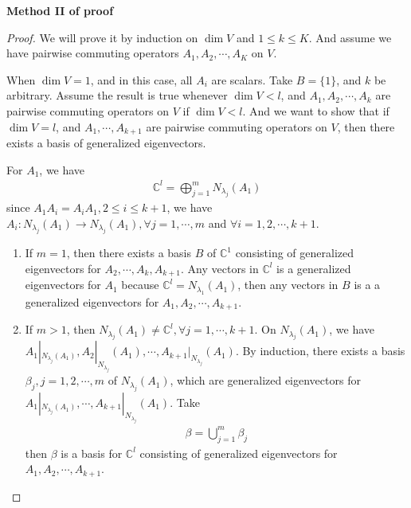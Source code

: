 \documentclass[11pt]{book}
\theoremstyle{definition}
\numberwithin{equation}{subsection}
\begin{document}
\noindent \textbf{Method II of proof}
\begin{proof}
We will prove it by induction on $\dim V$ and $1\leq k\leq K$. And assume we have pairwise commuting operators $A_1, A_2,\cdots, A_K$ on $V$. 

When $\dim V = 1$, and in this case, all $A_i$ are scalars. Take $B = \{1\}$, and $k$ be arbitrary. Assume the result is true whenever $\dim V < l$, and $A_1, A_2, \cdots, A_k$ are pairwise commuting operators on $V$ if $\dim V < l$. And we want to show that if $\dim V = l$, and $A_1, \cdots, A_{k+1}$ are pairwise commuting operators on $V$, then there exists a basis of generalized eigenvectors. 

For $A_1$, we have 
\begin{align*}
    \mathbb{C}^l = \bigoplus^m_{j=1}N_{\lambda_j}(A_1)
\end{align*}
since $A_1A_i = A_iA_1, 2 \leq i \leq k+1$, we have $A_i:N_{\lambda_j}(A_1)\rightarrow N_{\lambda_j}(A_1), \forall j = 1,\cdots, m$ and $\forall i = 1,2,\cdots, k+1$. 
\begin{enumerate}[label=(\arabic*)]
    \item If $m = 1$, then there exists a basis $B$ of $\mathbb{C}^1$ consisting of generalized eigenvectors for $A_2, \cdots, A_k,A_{k+1}$. Any vectors in $\mathbb{C}^l$ is a generalized eigenvectors for $A_1$ because $\mathbb{C}^l = N_{\lambda_1}(A_1)$, then any vectors in $B$ is a a generalized eigenvectors for $A_1, A_2, \cdots, A_{k+1}$.
    \item If $m > 1$, then $N_{\lambda_j}(A_1)\neq \mathbb{C}^l, \forall j = 1,\cdots, k+1$. On $N_{\lambda_j}(A_1)$, we have $A_1|_{N_{\lambda_j}(A_1)}, A_2|_N_{\lambda_j}(A_1), \cdots, A_{k+1}|_N_{\lambda_j}(A_1)$. By induction, there exists a basis $\beta_j, j=1,2,\cdots, m$ of $N_{\lambda_j}(A_1)$, which are generalized eigenvectors for $A_1|_{N_{\lambda_j}(A_1)}, \cdots, A_{k+1}|_N_{\lambda_j}(A_1)$. Take 
    \begin{align*}
        \beta = \bigcup^m_{j=1}\beta_j
    \end{align*}
    then $\beta$ is a basis for $\mathbb{C}^l$ consisting of generalized eigenvectors for $A_1, A_2, \cdots, A_{k+1}$.
\end{enumerate}
\end{proof}

\medskip
\end{document}
